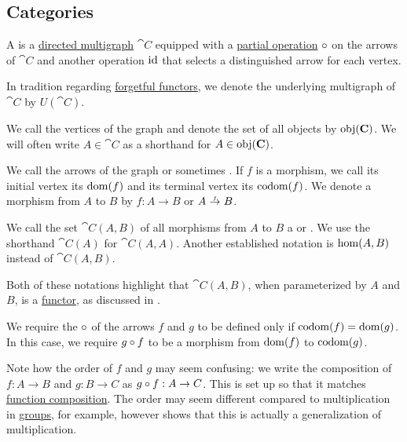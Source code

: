 \subsection{Categories}\label{subsec:categories}

\begin{definition}\label{def:category}
  A  is a \hyperref[def:directed_multigraph]{directed multigraph} \( \cat{C} \) equipped with a \hyperref[def:set_valued_map/partial]{partial operation} \( \bincirc \) on the arrows of \( \cat{C} \) and another operation \( \operatorname{id} \) that selects a distinguished arrow for each vertex.

  In tradition regarding \hyperref[def:concrete_category]{forgetful functors}, we denote the underlying multigraph of \( \cat{C} \) by \( U(\cat{C}) \).

  \begin{thmenum}[series=def:category]
     We call the vertices of the graph  and denote the set of all objects by \( \operatorname{obj}(\operatorname{\mathbf{C}}) \). We will often write \( A \in \cat{C} \) as a shorthand for \( A \in \operatorname{obj}(\operatorname{\mathbf{C}}) \).

     We call the arrows of the graph  or sometimes . If \( f \) is a morphism, we call its initial vertex its  \( \operatorname{dom}(f) \) and its terminal vertex its  \( \operatorname*{co\negthinspace\operatorname{dom}}(f) \). We denote a morphism from \( A \) to \( B \) by \( f: A \to B \) or \( A \reloset f \to B \).

    We call the set \( \cat{C}(A, B) \) of all morphisms from \( A \) to \( B \) a  or . We use the shorthand \( \cat{C}(A) \) for \( \cat{C}(A, A) \). Another established notation is \( \operatorname{hom}(A, B) \) instead of \( \cat{C}(A, B) \).

    Both of these notations highlight that \( \cat{C}(A, B) \), when parameterized by \( A \) and \( B \), is a \hyperref[def:functor]{functor}, as discussed in .

     We require the  \( \bincirc \) of the arrows \( f \) and \( g \) to be defined only if \( \operatorname*{co\negthinspace\operatorname{dom}}(f) = \operatorname{dom}(g) \). In this case, we require \( g \bincirc f \) to be a morphism from \( \operatorname{dom}(f) \) to \( \operatorname*{co\negthinspace\operatorname{dom}}(g) \).

    Note how the order of \( f \) and \( g \) may seem confusing: we write the composition of \( f: A \to B \) and \( g: B \to C \) as \( g \bincirc f: A \to C \). This is set up so that it matches \hyperref[def:set_valued_map/composition]{function composition}. The order may seem different compared to multiplication in \hyperref[def:group]{groups}, for example, however  shows that this is actually a generalization of multiplication.


\end{thmenum}
\end{definition}
